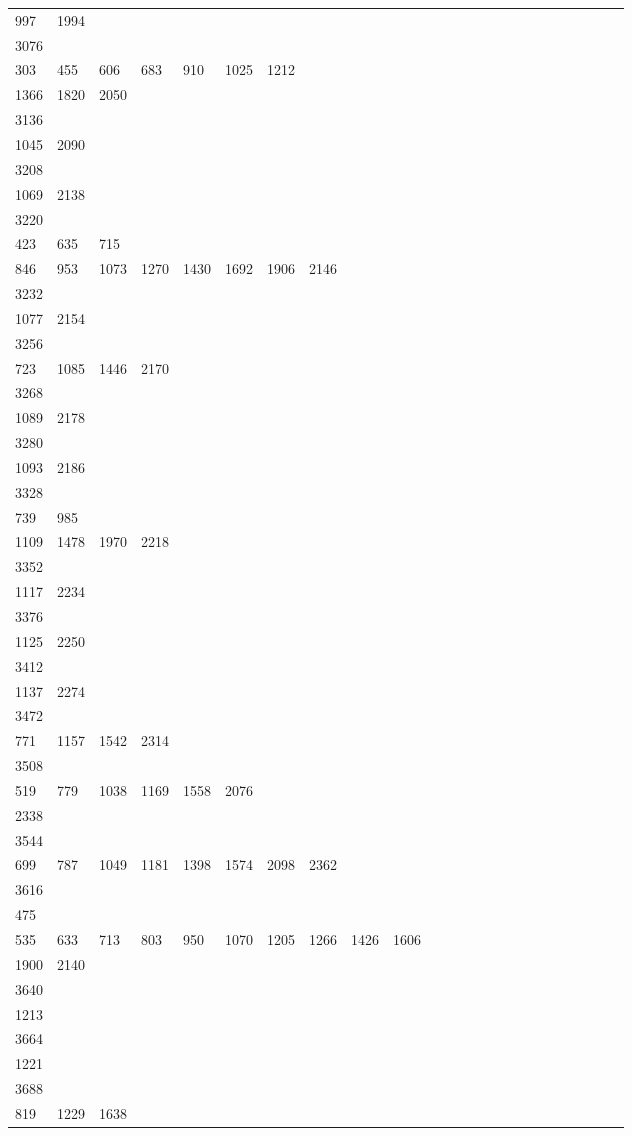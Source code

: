 \begin{longtable}{*{24}{l}}
997& 1994& \\
3076&&&&&&&&&\\
303& 455& 606& 683& 910& 1025& 1212\\
1366& 1820& 2050& \\
3136&&&&&&&&&\\
1045& 2090& \\
3208&&&&&&&&&\\
1069& 2138& \\
3220&&&&&&&&&\\
423& 635& 715\\
846& 953& 1073& 1270& 1430& 1692& 1906& 2146& \\
3232&&&&&&&&&\\
1077& 2154\\
3256&&&&&&&&&\\
723& 1085& 1446& 2170& \\
3268&&&&&&&&&\\
1089& 2178& \\
3280&&&&&&&&&\\
1093& 2186& \\
3328&&&&&&&&&\\
739& 985\\
1109& 1478& 1970& 2218& \\
3352&&&&&&&&&\\
1117& 2234& \\
3376&&&&&&&&&\\
1125& 2250& \\
3412&&&&&&&&&\\
1137& 2274\\
3472&&&&&&&&&\\
771& 1157& 1542& 2314& \\
3508&&&&&&&&&\\
519& 779& 1038& 1169& 1558& 2076\\
2338& \\
3544&&&&&&&&&\\
699& 787& 1049& 1181& 1398& 1574& 2098& 2362& \\
3616&&&&&&&&&\\
475\\
535& 633& 713& 803& 950& 1070& 1205& 1266& 1426& 1606\\
1900& 2140& \\
3640&&&&&&&&&\\
1213& \\
3664&&&&&&&&&\\
1221& \\
3688&&&&&&&&&\\
819& 1229& 1638& \\

\end{longtable}
